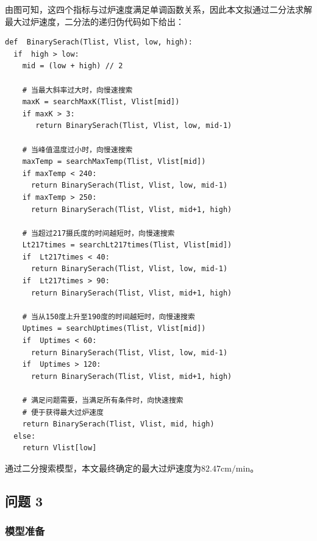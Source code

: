 \documentclass[../main.tex]{subfiles}
\begin{document}
由图可知，这四个指标与过炉速度满足单调函数关系，因此本文拟通过二分法求解最大过炉速度，二分法的递归伪代码如下给出：
\begin{verbatim}
def  BinarySerach(Tlist, Vlist, low, high):
  if  high > low:
    mid = (low + high) // 2

    # 当最大斜率过大时，向慢速搜索
    maxK = searchMaxK(Tlist, Vlist[mid])
    if maxK > 3:
       return BinarySerach(Tlist, Vlist, low, mid-1)

    # 当峰值温度过小时，向慢速搜索
    maxTemp = searchMaxTemp(Tlist, Vlist[mid])
    if maxTemp < 240:
      return BinarySerach(Tlist, Vlist, low, mid-1)
    if maxTemp > 250:
      return BinarySerach(Tlist, Vlist, mid+1, high)

    # 当超过217摄氏度的时间越短时，向慢速搜索
    Lt217times = searchLt217times(Tlist, Vlist[mid])
    if  Lt217times < 40:
      return BinarySerach(Tlist, Vlist, low, mid-1)
    if  Lt217times > 90:
      return BinarySerach(Tlist, Vlist, mid+1, high)

    # 当从150度上升至190度的时间越短时，向慢速搜索
    Uptimes = searchUptimes(Tlist, Vlist[mid])
    if  Uptimes < 60:
      return BinarySerach(Tlist, Vlist, low, mid-1)
    if  Uptimes > 120:
      return BinarySerach(Tlist, Vlist, mid+1, high)

    # 满足问题需要，当满足所有条件时，向快速搜索
    # 便于获得最大过炉速度
    return BinarySerach(Tlist, Vlist, mid, high)
  else:
    return Vlist[low]
\end{verbatim}
通过二分搜索模型，本文最终确定的最大过炉速度为\(82.47 \mathrm{cm}/\mathrm{min}\)。

\subsection{问题 3}

\subsubsection{模型准备}
\end{document}
